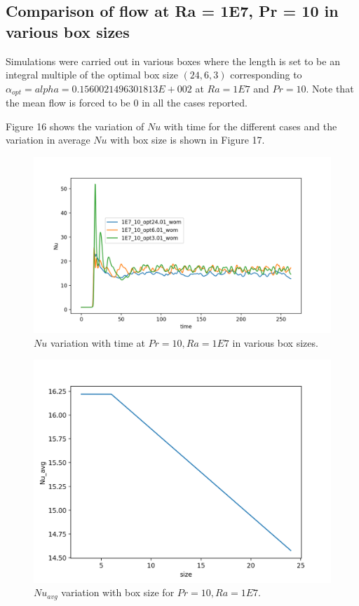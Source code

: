 \documentclass[12pt]{article}
\begin{document}
\subsection{Comparison of flow at Ra = 1E7, Pr = 10 in various box sizes}

Simulations were carried out in various boxes where the length is set to be an integral multiple of the optimal box size $(24, 6, 3)$ corresponding to $\alpha_{opt} = alpha = 0.1560021496301813E+002$ at $Ra = 1E7$ and $Pr = 10$. Note that the mean flow is forced to be 0 in all the cases reported.

Figure 16 shows the variation of $Nu$ with time for the different cases and the variation in average $Nu$ with box size is shown in Figure 17. 

     \begin{figure}[!htb]
     	\includegraphics[width=\linewidth]{Nu_1E7_10.png}
     	\caption{$Nu$ variation with time at $Pr = 10, Ra = 1E7$ in various box sizes.}
     	\label{fig:fig16}
     \end{figure} 
     
     \begin{figure}[!htb]
     	\includegraphics[width=\linewidth]{Nu_avg_1E7_10.png}
     	\caption{$Nu_{avg}$ variation with box size for $Pr = 10, Ra = 1E7$.}
     	\label{fig:fig17}
     \end{figure} 
     
\end{document}
